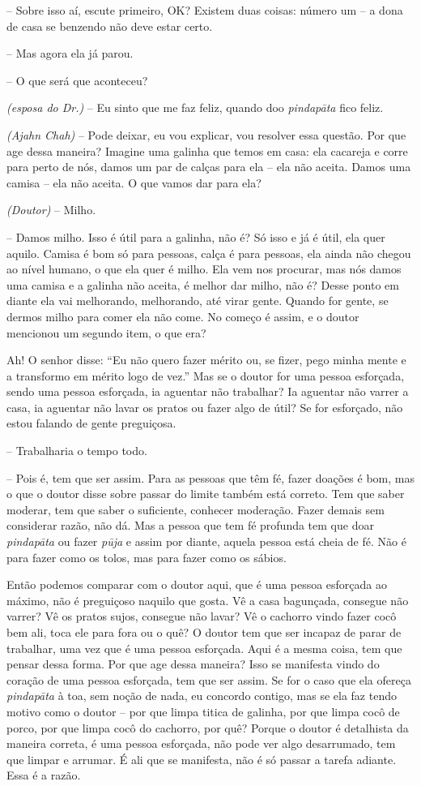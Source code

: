 -- Sobre isso aí, escute primeiro, OK? Existem duas coisas: número
um – a dona de casa se benzendo não deve estar certo.

-- Mas agora ela já parou.

-- O que será que aconteceu?

\textit{(esposa do Dr.)} -- Eu sinto que me faz feliz, quando doo
\textit{pindapāta} fico feliz.

\textit{(Ajahn Chah)} -- Pode deixar, eu vou explicar, vou resolver
essa questão. Por que age dessa maneira? Imagine uma galinha que temos
em casa: ela cacareja e corre para perto de nós, damos um par de calças
para ela – ela não aceita. Damos uma camisa – ela não aceita. O que
vamos dar para ela? 

\textit{(Doutor)} -- Milho.

-- Damos milho. Isso é útil para a galinha, não é? Só isso e já é
útil, ela quer aquilo. Camisa é bom só para pessoas, calça é para
pessoas, ela ainda não chegou ao nível humano, o que ela quer é milho.
Ela vem nos procurar, mas nós damos uma camisa e a galinha não aceita,
é melhor dar milho, não é? Desse ponto em diante ela vai melhorando,
melhorando, até virar gente. Quando for gente, se dermos milho para
comer ela não come. No começo é assim, e o doutor mencionou um segundo
item, o que era?

Ah! O senhor disse: “Eu não quero fazer mérito ou, se fizer, pego
minha mente e a transformo em mérito logo de vez.” Mas se o doutor for
uma pessoa esforçada, sendo uma pessoa esforçada, ia aguentar não
trabalhar? Ia aguentar não varrer a casa, ia aguentar não lavar os
pratos ou fazer algo de útil? Se for esforçado, não estou falando de
gente preguiçosa. 

-- Trabalharia o tempo todo.

-- Pois é, tem que ser assim. Para as pessoas que têm fé, fazer
doações é bom, mas o que o doutor disse sobre passar do limite também
está correto. Tem que saber moderar, tem que saber o suficiente,
conhecer moderação. Fazer demais sem considerar razão, não dá. Mas a
pessoa que tem fé profunda tem que doar \textit{pindapāta} ou fazer
\textit{pūja} e assim por diante, aquela pessoa está cheia de fé. Não
é para fazer como os tolos, mas para fazer como os sábios. 

Então podemos comparar com o doutor aqui, que é uma pessoa esforçada
ao máximo, não é preguiçoso naquilo que gosta. Vê a casa bagunçada,
consegue não varrer? Vê os pratos sujos, consegue não lavar? Vê o
cachorro vindo fazer cocô bem ali, toca ele para fora ou o quê? O
doutor tem que ser incapaz de parar de trabalhar, uma vez que é uma
pessoa esforçada. Aqui é a mesma coisa, tem que pensar dessa forma. Por
que age dessa maneira? Isso se manifesta vindo do coração de uma pessoa
esforçada, tem que ser assim. Se for o caso que ela ofereça
\textit{pindapāta} à toa, sem noção de nada, eu concordo contigo, mas
se ela faz tendo motivo como o doutor – por que limpa titica de
galinha, por que limpa cocô de porco, por que limpa cocô do cachorro,
por quê? Porque o doutor é detalhista da maneira correta, é uma pessoa
esforçada, não pode ver algo desarrumado, tem que limpar e arrumar. É
ali que se manifesta, não é só passar a tarefa adiante. Essa é a razão.


